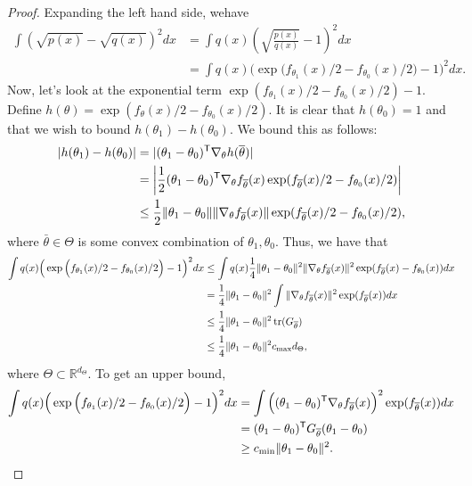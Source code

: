 \documentclass{article}
\begin{document}
\begin{proof}
Expanding the left hand side, wehave
\begin{align*}
\int (\sqrt{p(x)} - \sqrt{q(x)})^2 dx & = \int q(x) \left(
        \sqrt{ \frac{p(x)}{q(x)} } - 1 \right)^2 dx \\
&= \int q(x)
       \Big( \exp\Big( f_{\theta_1}(x)/2 - f_{\theta_0}(x)/2 \Big) - 1 \Big)^2 dx.
\end{align*}
Now, let's look at the exponential term $\exp( f_{\theta_1}(x)/2 - f_{\theta_0}(x)/2 ) - 1$. Define $h(\theta) = \exp(f_{\theta}(x)/2 - f_{\theta_0}(x)/2 )$. It is clear that $h(\theta_0) = 1$ and that we wish to bound $h(\theta_1) - h(\theta_0)$. We bound this as follows:
\begin{align*}
|h(\theta_1) - h(\theta_0)| &= |(\theta_1 - \theta_0)^{\mathsf{T}} \nabla_{\theta} h(\overline{\theta})| \\
   &= \left |\frac{1}{2} (\theta_1 - \theta_0)^{\mathsf{T}} \nabla_{\theta} f_{\overline{\theta}}(x) 
             \exp( f_{\overline{\theta}}(x)/2 - f_{\theta_0}(x)/2 ) \right|\\
&\leq \frac{1}{2} \| \theta_1 - \theta_0 \| 
                  \| \nabla_{\theta} f_{\overline{\theta}}(x) \| \exp( f_{\overline{\theta}}(x)/2 - f_{\theta_0}(x)/2 ), 
\end{align*}
where $\bar{\theta} \in \Theta$ is some convex combination of $\theta_1, \theta_0$. Thus, we have that
\begin{align*}
\int q(x)
       \Big( \exp\Big( f_{\theta_1}(x)/2 - f_{\theta_0}(x)/2 \Big) - 1 \Big)^2 dx 
  &\leq 
  \int q(x) \frac{1}{4} \| \theta_1 - \theta_0 \|^2 \| \nabla_{\theta} f_{\overline{\theta}}(x) \|^2 
               \exp( f_{\overline{\theta}}(x) - f_{\theta_0}(x)) dx \\
  &= \frac{1}{4} \| \theta_1 - \theta_0 \|^2 \int  \| \nabla_{\theta} f_{\overline{\theta}}(x) \|^2  
            \exp( f_{\overline{\theta}} (x)) d x \\
  &\leq \frac{1}{4}  \| \theta_1 - \theta_0 \|^2 \mathop{\text{tr}}( G_{\overline{\theta}} ) \\
  &\leq \frac{1}{4}  \| \theta_1 - \theta_0 \|^2 c_{\max} d_{\Theta},
\end{align*}
where $\Theta \subset \mathbb R^{d_\Theta}$. To get an upper bound,
\begin{align*}
\int q(x)
       \Big( \exp\Big( f_{\theta_1}(x)/2 - f_{\theta_0}(x)/2 \Big) - 1 \Big)^2 dx 
   &= \int \Big( (\theta_1 - \theta_0)^{\mathsf{T}} \nabla_{\theta} f_{\overline{\theta}}(x) \Big)^2 
               \exp(f_{\overline{\theta}}(x))  dx \\
   &= (\theta_1 - \theta_0)^{\mathsf{T}} G_{\overline{\theta}} (\theta_1 - \theta_0)  \\
   &\geq c_{\min} \| \theta_1 - \theta_0 \|^2.
\end{align*}
\end{proof}
\end{document}
